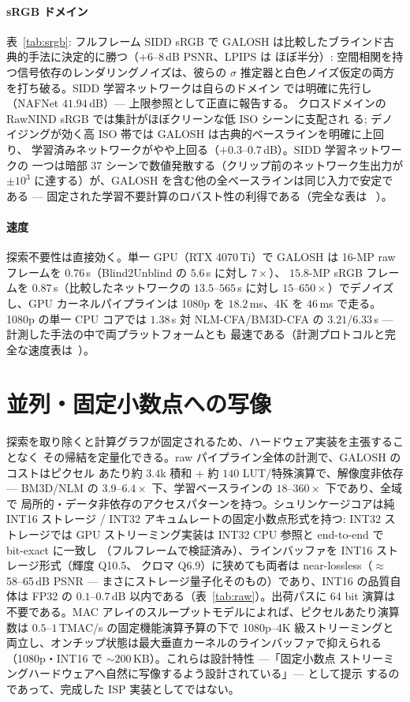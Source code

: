 \documentclass[journal]{IEEEtran}
\begin{document}
\paragraph{sRGB ドメイン} 表~\ref{tab:srgb}: フルフレーム SIDD sRGB で GALOSH
は比較したブラインド古典的手法に決定的に勝つ（$+6$--$8$\,dB PSNR、LPIPS は
ほぼ半分）: 空間相関を持つ信号依存のレンダリングノイズは、彼らの $\sigma$
推定器と白色ノイズ仮定の両方を打ち破る。SIDD 学習ネットワークは自らのドメイン
では明確に先行し（NAFNet $41.94$\,dB）--- 上限参照として正直に報告する。
クロスドメインの RawNIND sRGB では集計がほぼクリーンな低 ISO シーンに支配され
る; デノイジングが効く高 ISO 帯では GALOSH は古典的ベースラインを明確に上回り、
学習済みネットワークがやや上回る（$+0.3$--$0.7$\,dB）。SIDD 学習ネットワークの
一つは暗部 37 シーンで数値発散する（クリップ前のネットワーク生出力が
$\pm10^3$ に達する）が、GALOSH を含む他の全ベースラインは同じ入力で安定である
--- 固定された学習不要計算のロバスト性の利得である（完全な表は
~\cite{galosharxiv}）。

\paragraph{速度} 探索不要性は直接効く。単一 GPU（RTX 4070\,Ti）で GALOSH は
16-MP raw フレームを $0.76$\,s（Blind2Unblind の $5.6$\,s に対し $7\times$）、
$15.8$-MP sRGB フレームを $0.87$\,s（比較したネットワークの $13.5$--$565$\,s
に対し $15$--$650\times$）でデノイズし、GPU カーネルパイプラインは 1080p を
$18.2$\,ms、4K を $46$\,ms で走る。1080p の単一 CPU コアでは $1.38$\,s 対
NLM-CFA/BM3D-CFA の $3.21$/$6.33$\,s --- 計測した手法の中で両プラットフォームとも
最速である（計測プロトコルと完全な速度表は~\cite{galosharxiv}）。

\section{並列・固定小数点への写像}
探索を取り除くと計算グラフが固定されるため、ハードウェア実装を主張することなく
その帰結を定量化できる。raw パイプライン全体の計測で、GALOSH のコストはピクセル
あたり約 $3.4$k 積和 + 約 $140$ LUT/特殊演算で、解像度非依存 --- BM3D/NLM の
$3.9$--$6.4\times$ 下、学習ベースラインの $18$--$360\times$ 下であり、全域で
局所的・データ非依存のアクセスパターンを持つ。シュリンケージコアは純 INT16
ストレージ / INT32 アキュムレートの固定小数点形式を持つ: INT32 ストレージでは
GPU ストリーミング実装は INT32 CPU 参照と end-to-end で bit-exact に一致し
（フルフレームで検証済み）、ラインバッファを INT16 ストレージ形式（輝度 Q10.5、
クロマ Q6.9）に狭めても両者は near-lossless（$\approx$58--65\,dB PSNR ---
まさにストレージ量子化そのもの）であり、INT16 の品質自体は FP32 の
$0.1$--$0.7$\,dB 以内である（表~\ref{tab:raw}）。出荷パスに 64 bit 演算は
不要である。MAC アレイのスループットモデルによれば、ピクセルあたり演算数は
$0.5$--$1$\,TMAC/s の固定機能演算予算の下で 1080p--4K 級ストリーミングと
両立し、オンチップ状態は最大垂直カーネルのラインバッファで抑えられる
（1080p・INT16 で ${\sim}200$\,KB）。これらは設計特性 ---「固定小数点
ストリーミングハードウェアへ自然に写像するよう設計されている」--- として提示
するのであって、完成した ISP 実装としてではない。
\end{document}
